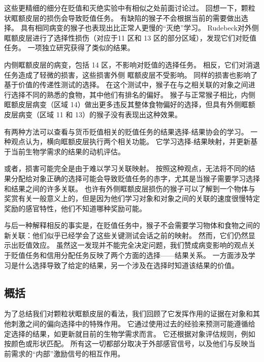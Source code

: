 这些更精细的细分在贬值和灭绝实验中有相似之处前面讨论过。
回想一下，颗粒状眶额皮层的损伤会导致贬值任务。
有缺陷的猴子不会根据当前的需要做出选择。
具有相同病变的猴子也表现出比正常人更慢的“灭绝”学习。
Rudebeck\cite{rudebeck2011dissociable}对外侧眶额皮层进行了选择性损伤（对应于11 区和 13 区的部分区域），发现它们对贬值任务。
一项独立研究获得了类似的结果\cite{machado2007effects}。\par


内侧眶额皮层的病变，包括 14 区，不影响对贬值的选择任务。
相反，它们对消退任务造成了轻微的损害，这些损害外侧 眶额皮层不受影响。
同样的损害也影响了基于价值的传递性测试的选择。
在这个测试中，猴子在与之相关联的对象之间进行选择不同的熟悉的食物，其中他们有排名的偏好。
猴子与正常猴子相比，内侧眶额皮层病变（区域 14）做出更多违反其整体食物偏好的选择，但具有外侧眶额皮层病变（区域 11 和 13）的猴子没有表现出这种效果\cite{rudebeck2011dissociable}。\par


有两种方法可以查看与货币贬值相关的贬值任务的结果选择-结果协会的学习。
一种观点认为，横向眶额皮层执行两个相关功能。
它学习选择-结果映射，并更新基于当前生物学需求的结果的动机评估。\par


或者，损害可能完全是由于难以学习关联映射。
按照这种观点，无法将不同的结果分配给对象正确的选择可能会导致贬值任务的赤字，尤其是当猴子需要学习选择和结果之间的许多关联。
也许有外侧眶额皮层损伤的猴子可以了解到一个物体与奖赏有关一般意义上的，但是因为他们学习对象和对象之间的关联的速度很慢特定奖励的感官特性，他们不知道哪种奖励可能。\par


与后一种解释相反的事实是，在贬值任务中，猴子不会需要学习物体和食物之间的新关联：他们似乎已经学会了这些关键测试会话之前的映射。
然而，它们仍然显示出贬值效应。
虽然这一发现并不能完全决定问题，我们赞成病变影响的观点关于贬值任务和信用分配任务反映了两个方面的选择——结果关系。
一方面涉及学习是什么选择导致了给定的结果，另一个涉及在选择时知道该结果的价值。\par



\subsection{概括}

为了总结我们对颗粒状眶额皮层的看法，我们回顾了它发挥作用的证据在对象和其他刺激之间的偏向选择中的特殊作用。
它通过使用过去的经验来预测可能遵循给定选择的结果，如更新就目前的生物学需求而言。
它还根据对象评估规则，例如按颜色或形状匹配。
所有这一切都部分取决于外部感官信号，以及他们与反映当前需求的“内部”激励信号的相互作用。\par


